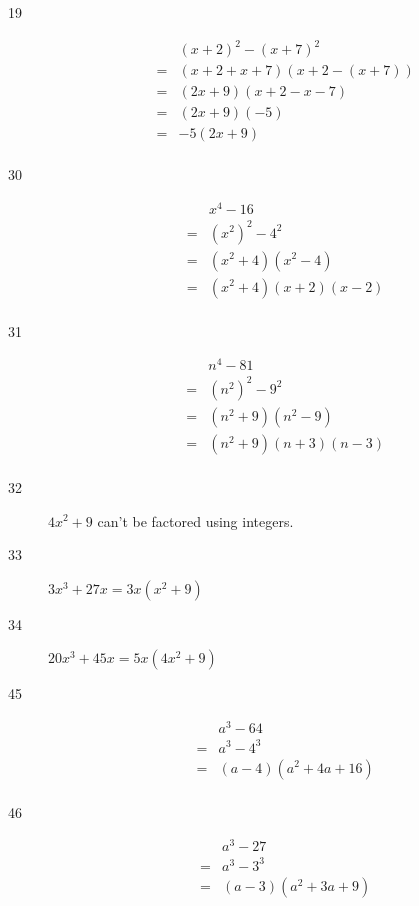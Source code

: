 \documentclass[fleqn,addpoints]{exam}
\begin{document}
\begin{description}
\item[19]
\begin{eqnarray*}
  &&  (x + 2)^2 - (x + 7)^2 \\
  &=& (x + 2 + x + 7)(x + 2 - (x + 7)) \\
  &=& (2x + 9)(x + 2 - x - 7) \\ 
  &=& (2x + 9)(-5) \\ 
  &=& -5(2x + 9) \\ 
\end{eqnarray*}


\item[30]
\begin{eqnarray*}
  && x^4 - 16 \\
  &=& (x^2)^2 - 4^2 \\
  &=& (x^2 + 4)(x^2 - 4) \\
  &=& (x^2 + 4)(x + 2)(x - 2) \\
\end{eqnarray*}

\item[31]
\begin{eqnarray*}
  && n^4 - 81 \\
  &=& (n^2)^2 - 9^2 \\
  &=& (n^2 + 9)(n^2 - 9) \\
  &=& (n^2 + 9)(n + 3)(n - 3) \\
\end{eqnarray*}

\item[32]
$4x^2 + 9$ can't be factored using integers.

\item[33]
\( 3x^3 + 27x = 3x(x^2 + 9) \)

\item[34]
\( 20x^3 + 45x = 5x(4x^2 + 9) \)

\item[45]
\begin{eqnarray*}
  &&  a^3 - 64 \\
  &=& a^3 - 4^3 \\
  &=& (a - 4)(a^2 + 4a + 16) \\ 
\end{eqnarray*}

\item[46]
\begin{eqnarray*}
  &&  a^3 - 27 \\
  &=& a^3 - 3^3 \\
  &=& (a - 3)(a^2 + 3a + 9) \\ 
\end{eqnarray*}


\end{description}
\end{document}
